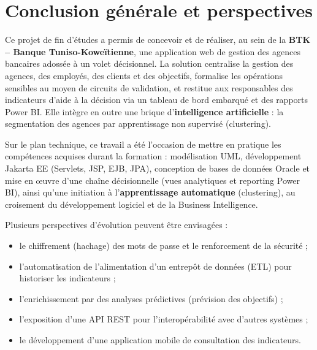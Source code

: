 \chapter*{Conclusion générale et perspectives}

Ce projet de fin d'études a permis de concevoir et de réaliser, au sein de la
\textbf{BTK -- Banque Tuniso-Koweïtienne}, une application web de gestion des
agences bancaires adossée à un volet décisionnel. La solution centralise la
gestion des agences, des employés, des clients et des objectifs, formalise les
opérations sensibles au moyen de circuits de validation, et restitue aux
responsables des indicateurs d'aide à la décision via un tableau de bord embarqué
et des rapports Power BI. Elle intègre en outre une brique d'\textbf{intelligence
artificielle} : la segmentation des agences par apprentissage non supervisé
(clustering).

Sur le plan technique, ce travail a été l'occasion de mettre en pratique les
compétences acquises durant la formation : modélisation UML, développement
Jakarta EE (Servlets, JSP, EJB, JPA), conception de bases de données Oracle et
mise en œuvre d'une chaîne décisionnelle (vues analytiques et reporting Power BI),
ainsi qu'une initiation à l'\textbf{apprentissage automatique} (clustering), au
croisement du développement logiciel et de la Business Intelligence.

Plusieurs perspectives d'évolution peuvent être envisagées :
\begin{itemize}[noitemsep]
  \item le chiffrement (hachage) des mots de passe et le renforcement de la
        sécurité ;
  \item l'automatisation de l'alimentation d'un entrepôt de données (ETL) pour
        historiser les indicateurs ;
  \item l'enrichissement par des analyses prédictives (prévision des objectifs) ;
  \item l'exposition d'une API REST pour l'interopérabilité avec d'autres
        systèmes ;
  \item le développement d'une application mobile de consultation des indicateurs.
\end{itemize}
